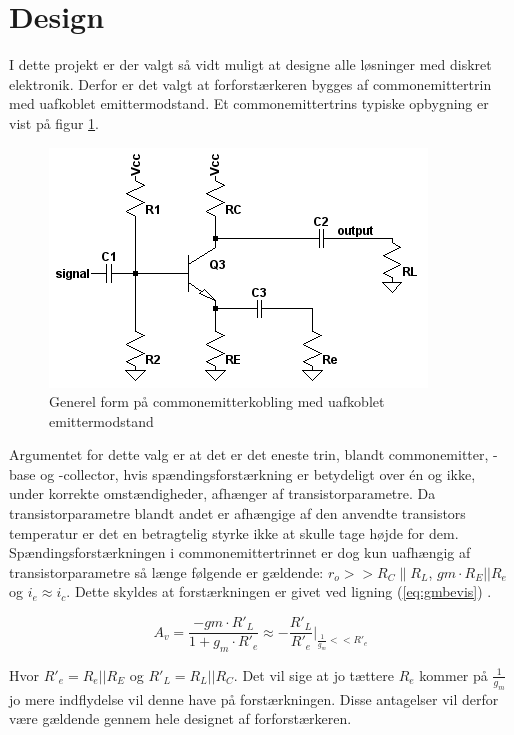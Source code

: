 \section{Design}
I dette projekt er der valgt så vidt muligt at designe alle løsninger med diskret elektronik. Derfor er det valgt at forforstærkeren bygges af commonemittertrin med uafkoblet emittermodstand. Et commonemittertrins typiske opbygning er vist på figur \ref{fig:cekobling}.

\begin{figure}[h]
\centering
\includegraphics[scale=.6]{teknisk/forforstaerker/ceopkobling.png}
\caption{Generel form på commonemitterkobling med uafkoblet emittermodstand}
\label{fig:cekobling}
\end{figure}


Argumentet for dette valg er at det er det eneste trin, blandt commonemitter, -base og -collector, hvis spændingsforstærkning er betydeligt over én og ikke, under korrekte omstændigheder, afhænger af transistorparametre. Da transistorparametre blandt andet er afhængige af den anvendte transistors temperatur er det en betragtelig styrke ikke at skulle tage højde for dem. Spændingsforstærkningen i commonemittertrinnet er dog kun uafhængig af transistorparametre så længe følgende er gældende: $r_o >>R_C \| R_L$, $gm \cdot R_E||R_e$ og $i_e \approx i_c$.
Dette skyldes at forstærkningen er givet ved ligning (\ref{eq:gmbevis}) \cite{ael-mm6}.

\begin{equation}
A_v =  \frac{-gm \cdot R'_L}{1+g_m \cdot R'_e} \approx  -\frac{R'_L}{R'_e} \Biggr\vert _{\frac{1}{g_m}<<R'_e}
\label{eq:gmbevis}
\end{equation}

Hvor $R'_e = R_e || R_E$ og $R'_L = R_L||R_C$. Det vil sige at jo tættere $R_e$ kommer på $\frac{1}{g_m}$ jo mere indflydelse vil denne have på forstærkningen. Disse antagelser vil derfor være gældende gennem hele designet af forforstærkeren. 

